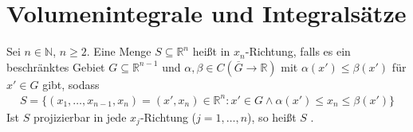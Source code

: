 %

\section{Volumenintegrale und Integralsätze}
\addtocounter{thmn}{1}
\setcounter{theorem}{0}


\begin{theorem}[Definition]
  Sei $n \in \mathbb{N}$, $n \geq 2$. Eine Menge $S \subseteq \mathbb{R}^n$ heißt  in $x_n$-Richtung, falls es ein beschränktes Gebiet $G \subseteq \mathbb{R}^{n-1}$ und $\alpha, \beta \in C(\overline{G} \to \mathbb{R})$ mit $\alpha(x') \leq \beta(x')$ für $x' \in G$ gibt, sodass
  \begin{align*}
    S = \{ (x_1,\ldots,x_{n-1},x_n) = (x',x_n) \in \mathbb{R}^n : x' \in G \land \alpha(x') \leq x_n \leq \beta(x') \}
  \end{align*}
  Ist $S$ projizierbar in jede $x_j$-Richtung ($j = 1,\ldots,n$), so heißt $S$ .
\end{theorem}

